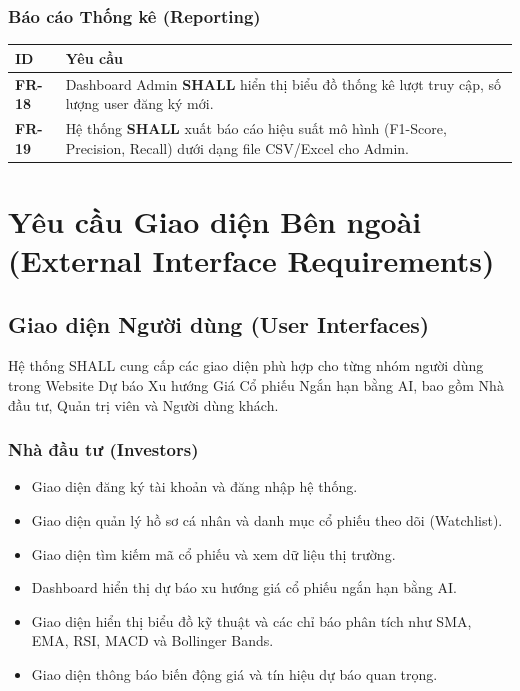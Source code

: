 \documentclass[12pt, a4paper]{article}
\begin{document}
\subsubsection{Báo cáo Thống kê (Reporting)}

\begin{table}[H]
    \centering
    \renewcommand{\arraystretch}{1.3}

    \begin{tabularx}{\textwidth}{|l|X|}
        \hline
        \rowcolor{gray!10}
        \textbf{ID}    & \textbf{Yêu cầu}                                                                                                         \\
        \hline
        \textbf{FR-18} & Dashboard Admin \textbf{SHALL} hiển thị biểu đồ thống kê lượt truy cập, số lượng user đăng ký mới.                       \\
        \hline
        \textbf{FR-19} & Hệ thống \textbf{SHALL} xuất báo cáo hiệu suất mô hình (F1-Score, Precision, Recall) dưới dạng file CSV/Excel cho Admin. \\
        \hline
    \end{tabularx}

\end{table}
\section{Yêu cầu Giao diện Bên ngoài (External Interface Requirements)}

\subsection{Giao diện Người dùng (User Interfaces)}

Hệ thống SHALL cung cấp các giao diện phù hợp cho từng nhóm người dùng trong Website Dự báo Xu hướng Giá Cổ phiếu Ngắn hạn bằng AI, bao gồm Nhà đầu tư, Quản trị viên và Người dùng khách.


\subsubsection{Nhà đầu tư (Investors)}
\begin{itemize}
    \item Giao diện đăng ký tài khoản và đăng nhập hệ thống.

    \item Giao diện quản lý hồ sơ cá nhân và danh mục cổ phiếu theo dõi (Watchlist).

    \item Giao diện tìm kiếm mã cổ phiếu và xem dữ liệu thị trường.

    \item Dashboard hiển thị dự báo xu hướng giá cổ phiếu ngắn hạn bằng AI.

    \item Giao diện hiển thị biểu đồ kỹ thuật và các chỉ báo phân tích như SMA, EMA, RSI, MACD và Bollinger Bands.

    \item Giao diện thông báo biến động giá và tín hiệu dự báo quan trọng.
\end{itemize}
\end{document}
